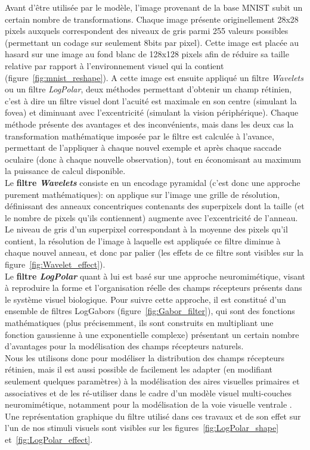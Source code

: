 Avant d'être utilisée par le modèle, l'image provenant de la base MNIST subit un certain nombre de transformations.
Chaque image présente originellement 28x28 pixels auxquels correspondent des niveaux de gris parmi 255 valeurs possibles (permettant un codage sur seulement 8bits par pixel). Cette image est placée au hasard sur une image au fond blanc de 128x128 pixels afin de réduire sa taille relative par rapport à l'environnement visuel qui la contient (figure~\ref{fig:mnist_reshape}).
A cette image est ensuite appliqué un filtre \textit{Wavelets} ou un filtre \textit{LogPolar}, deux méthodes permettant d'obtenir un champ rétinien, c'est à dire un filtre visuel dont l'acuité est maximale en son centre (simulant la fovea) et diminuant avec l'excentricité (simulant la vision périphérique).
Chaque méthode présente des avantages et des inconvénients, mais dans les deux cas la transformation mathématique imposée par le filtre est calculée à l'avance, permettant de l'appliquer à chaque nouvel exemple et après chaque saccade oculaire (donc à chaque nouvelle observation), tout en économisant au maximum la puissance de calcul disponible.\autocite{Kortum1996}\\
Le \textbf{filtre \textit{Wavelets}} consiste en un encodage pyramidal (c'est donc une approche purement mathématiques): on applique sur l'image une grille de résolution, définissant des anneaux concentriques contenants des superpixels dont la taille (et le nombre de pixels qu'ils contiennent) augmente avec l'excentricité de l'anneau. Le niveau de gris d'un superpixel correspondant à la moyenne des pixels qu'il contient, la résolution de l'image à laquelle est appliquée ce filtre diminue à chaque nouvel anneau, et donc par palier (les effets de ce filtre sont visibles sur la figure~\ref{fig:Wavelet_effect}). \autocite{Kortum1996} \\
Le \textbf{filtre \textit{LogPolar}} quant à lui est basé sur une approche neuromimétique, visant à reproduire la forme et l'organisation réelle des champs récepteurs présents dans le système visuel biologique. Pour suivre cette approche, il est constitué d'un ensemble de filtres LogGabors (figure~\ref{fig:Gabor_filter}), qui sont des fonctions mathématiques (plus précisemment, ils sont construits en multipliant une fonction gaussienne à une exponentielle complexe) présentant un certain nombre d'avantages pour la modélisation des champs récepteurs naturels\autocite{Fischer2007, SLIP}. \\
Nous les utilisons donc pour modéliser la distribution des champs récepteurs rétinien, mais il est aussi possible de facilement les adapter (en modifiant seulement quelques paramètres) à la modélisation des aires visuelles primaires et associatives et de les ré-utiliser dans le cadre d'un modèle visuel multi-couches neuromimétique, notamment pour la modélisation de la voie visuelle ventrale \autocite{Freeman2011}. \\
Une représentation graphique du filtre utilisé dans ces travaux et de son effet sur l'un de nos stimuli visuels sont visibles sur les figures~\ref{fig:LogPolar_shape} et~\ref{fig:LogPolar_effect}. \\

